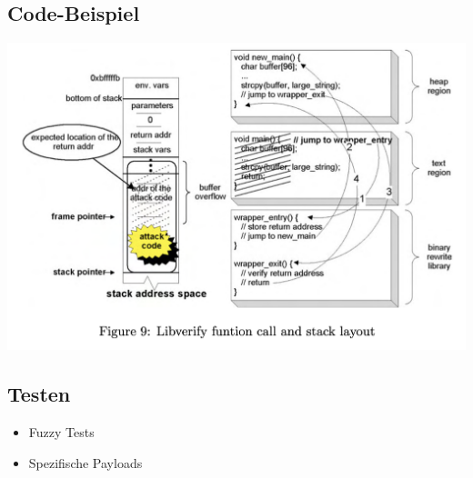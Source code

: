 \subsection{Code-Beispiel}
    \begin{center}
        \includegraphics[width=\textwidth,height=0.75\textheight,keepaspectratio]{images/Libverify.png}
    \end{center}

\subsection{Testen}
    \begin{itemize}
        \item Fuzzy Tests
        \item Spezifische Payloads
    \end{itemize}
